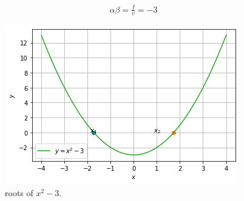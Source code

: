 \documentclass[journal,12pt,twocolumn]{IEEEtran}
\begin{document}
\begin{enumerate}
\begin{align}
\alpha\beta = \frac{f}{v} = -3
\end{align}
\begin{figure}[ht!]
\centering
\includegraphics[width=\columnwidth]{download (2).png}
\caption{roots of $x^2-3$.}
\label{fig:Roots Of $x^2-3 &=$.}
\end{figure}
\end{enumerate}
\end{document}
